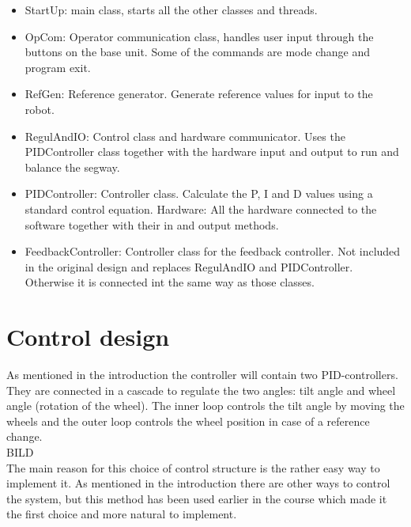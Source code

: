 \documentclass[a4paper]{article}
\begin{document}
\begin{itemize}
\item StartUp: main class, starts all the other classes and threads.
\item OpCom: Operator communication class, handles user input through the buttons on the base unit. Some of the commands are mode change and program exit. 
\item RefGen: Reference generator. Generate reference values for input to the robot. 
\item RegulAndIO: Control class and hardware communicator. Uses the PIDController class together with the hardware input and output to run and balance the segway.
\item PIDController: Controller class. Calculate the P, I and D values using a standard control equation.
Hardware: All the hardware connected to the software together with their in and output methods.
\item FeedbackController: Controller class for the feedback controller. Not included in the original design and replaces RegulAndIO and PIDController. Otherwise it is connected int the same way as those classes. 
\end{itemize}

\section{Control design}
As mentioned in the introduction the controller will contain two PID-controllers. They are connected in a cascade to regulate the two angles: tilt angle and wheel angle (rotation of the wheel). The inner loop controls the tilt angle by moving the wheels and the outer loop controls the wheel position in case of a reference change.\\

BILD\\

The main reason for this choice of control structure is the rather easy way to implement it. As mentioned in the introduction there are other ways to control the system, but this method has been used earlier in the course which made it the first choice and more natural to implement. \\
\end{document}
